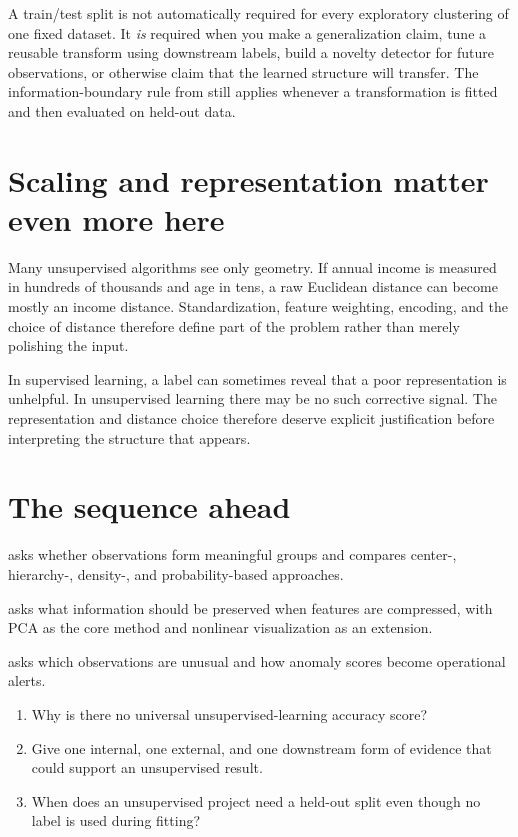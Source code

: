 A train/test split is not automatically required for every exploratory clustering of one fixed dataset. It \emph{is} required when you make a generalization claim, tune a reusable transform using downstream labels, build a novelty detector for future observations, or otherwise claim that the learned structure will transfer. The information-boundary rule from  still applies whenever a transformation is fitted and then evaluated on held-out data.

\section{Scaling and representation matter even more here}

Many unsupervised algorithms see only geometry. If annual income is measured in hundreds of thousands and age in tens, a raw Euclidean distance can become mostly an income distance. Standardization, feature weighting, encoding, and the choice of distance therefore define part of the problem rather than merely polishing the input.

\begin{keyidea}
In supervised learning, a label can sometimes reveal that a poor representation is unhelpful. In unsupervised learning there may be no such corrective signal. The representation and distance choice therefore deserve explicit justification before interpreting the structure that appears.
\end{keyidea}

\section{The sequence ahead}

\begin{description}[leftmargin=1.6in,style=nextline]
  \item[\chapref{ch:clustering}] asks whether observations form meaningful groups and compares center-, hierarchy-, density-, and probability-based approaches.
  \item[\chapref{ch:dimred}] asks what information should be preserved when features are compressed, with PCA as the core method and nonlinear visualization as an extension.
  \item[\chapref{ch:anomaly}] asks which observations are unusual and how anomaly scores become operational alerts.
\end{description}


\begin{quickcheck}
\begin{enumerate}
  \item Why is there no universal unsupervised-learning accuracy score?
  \item Give one internal, one external, and one downstream form of evidence that could support an unsupervised result.
  \item When does an unsupervised project need a held-out split even though no label is used during fitting?
\end{enumerate}
\end{quickcheck}

